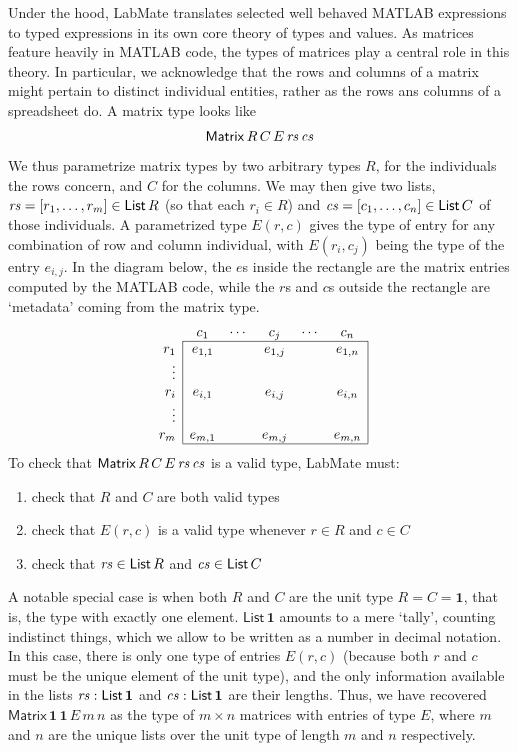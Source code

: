 \documentclass{IMEKO2024}
\newcommand{\One}{\mathbf{1}}
\newcommand{\Matrix}[5]{\mathsf{Matrix}\,#1\,#2\,#3\,#4\,#5}
\newcommand{\List}[1]{\mathsf{List}\,#1}
\newcommand{\param}{parametrize}
\begin{document}
Under the hood, LabMate translates selected well behaved MATLAB expressions
to typed expressions in its own core theory of types and values.
%
As matrices feature heavily in MATLAB code, the types of matrices
play a central role in this theory.
%
In particular, we acknowledge that the rows and columns of a matrix might pertain to distinct individual entities, rather as the rows ans columns of a spreadsheet do.
%
A matrix type looks like
\[\Matrix{R}{C}{E}{\rs}{\cs}
\]
%
We thus \param{} matrix types by two arbitrary types $R$, for the individuals the rows concern, and $C$ for the columns. We may then give two lists, $\rs = [r_1,\ldots,r_m]\in\List{R}$ (so that each $r_i\in R$) and $\cs = [c_1,\ldots,c_n]\in\List{C}$ of those individuals. A \param{}d type $E(r,c)$ gives the type of entry for any combination of row and column individual, with $E(r_i,c_j)$ being the type of the entry $e_{i,j}$. In the diagram below, the $e$s inside the rectangle are the matrix entries computed by the MATLAB code, while the $r$s and $c$s outside the rectangle are `metadata' coming from the matrix type.
\[\begin{array}{r|ccccc|}
\multicolumn{1}{c}{\;} & c_1      & \cdots & c_j     & \cdots & \multicolumn{1}{c}{c_n}     \\
      \cline{2-6}
r_1    & e_{1,1}  &        & e_{1,j} &        & e_{1,n} \\
\vdots &          &        &         &        &         \\
r_i    & e_{i,1}  &        & e_{i,j} &        & e_{i,n} \\
\vdots &          &        &         &        &         \\
r_m    & e_{m,1}  &        & e_{m,j} &        & e_{m,n}  \\
      \cline{2-6}
\end{array}\]
To check that $\Matrix{R}{C}{E}{\rs}{\cs}$ is a valid type, LabMate must:
\begin{enumerate}
\item check that $R$ and $C$ are both valid types
\item check that $E(r,c)$ is a valid type whenever $r\in R$ and $c\in C$
\item check that $\rs\in\List{R}$ and $\cs\in\List{C}$
\end{enumerate}


A notable special case is when both $R$ and $C$ are the unit type $R = C = \One$, that is, the type with exactly one element.
%
$\List{\One}$ amounts to a mere `tally', counting indistinct things, which we allow to be written as a number in decimal notation.
%
In this case, there is only one type of entries $E(r,c)$ (because both $r$
and $c$ must be the unique element of the unit type), and the only
information available in the lists $\rs : \List{\One}$ and
$\cs : \List{\One}$ are their lengths.
%
Thus, we have recovered $\Matrix{\One}{\One}{E}{m}{n}$ as the type of
$m \times n$ matrices with entries of type $E$, where $m$ and $n$ are
the unique lists over the unit type of length $m$ and $n$
respectively.
\end{document}
